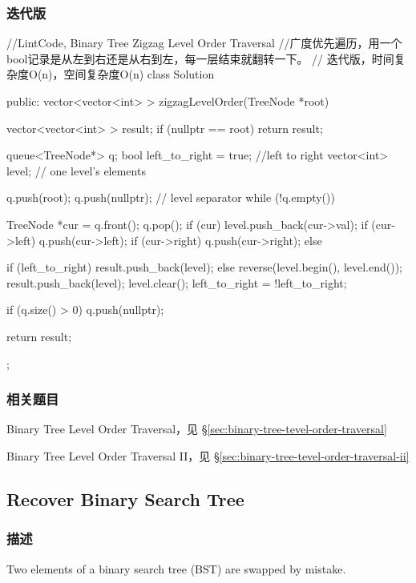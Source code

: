 \subsubsection{迭代版}
\begin{Code}
//LintCode, Binary Tree Zigzag Level Order Traversal
//广度优先遍历，用一个bool记录是从左到右还是从右到左，每一层结束就翻转一下。
// 迭代版，时间复杂度O(n)，空间复杂度O(n)
class Solution {
public:
    vector<vector<int> > zigzagLevelOrder(TreeNode *root) {
        vector<vector<int> > result;
        if (nullptr == root) return result;

        queue<TreeNode*> q;
        bool left_to_right = true;  //left to right
        vector<int> level;  // one level's elements

        q.push(root);
        q.push(nullptr);  // level separator
        while (!q.empty()) {
            TreeNode *cur = q.front();
            q.pop();
            if (cur) {
                level.push_back(cur->val);
                if (cur->left) q.push(cur->left);
                if (cur->right) q.push(cur->right);
            } else {
                if (left_to_right) {
                    result.push_back(level);
                } else {
                    reverse(level.begin(), level.end());
                    result.push_back(level);
                }
                level.clear();
                left_to_right = !left_to_right;

                if (q.size() > 0) q.push(nullptr);
            }
        }

        return result;
    }
};
\end{Code}


\subsubsection{相关题目}
\begindot
\item Binary Tree Level Order Traversal，见 \S \ref{sec:binary-tree-tevel-order-traversal}
\item Binary Tree Level Order Traversal II，见 \S \ref{sec:binary-tree-tevel-order-traversal-ii}
\myenddot


\subsection{Recover Binary Search Tree}
\label{sec:recover-binary-search-tree}


\subsubsection{描述}
Two elements of a binary search tree (BST) are swapped by mistake.

